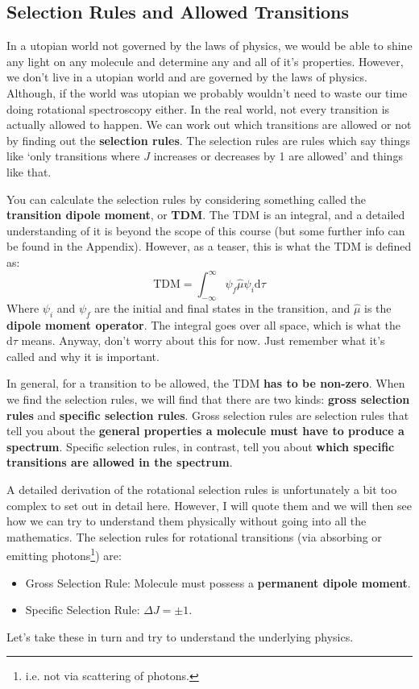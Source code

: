 \documentclass{memoir}[11pt,oneside,a4paper,openany]
\begin{document}
\subsection{Selection Rules and Allowed Transitions}
In a utopian world not governed by the laws of physics, we would be able to shine any light on any molecule and determine any and all of it's properties. However, we don't live in a utopian world and are governed by the laws of physics. Although, if the world was utopian we probably wouldn't need to waste our time doing rotational spectroscopy either. In the real world, not every transition is actually allowed to happen. We can work out which transitions are allowed or not by finding out the \textbf{selection rules}. The selection rules are rules which say things like `only transitions where $J$ increases or decreases by 1 are allowed' and things like that.

You can calculate the selection rules by considering something called the \textbf{transition dipole moment}, or \textbf{TDM}. The TDM is an integral, and a detailed understanding of it is beyond the scope of this course (but some further info can be found in the Appendix). However, as a teaser, this is what the TDM is defined as:
\begin{equation}
	\text{TDM} = \int_{-\infty}^{\infty} \psi_{f}\hat{\mu}\psi_{i} \mathrm{d}\tau
\end{equation}
Where $\psi_i$ and $\psi_f$ are the initial and final states in the transition, and $\hat{\mu}$ is the \textbf{dipole moment operator}. The integral goes over all space, which is what the $\mathrm{d}\tau$ means. Anyway, don't worry about this for now. Just remember what it's called and why it is important.

In general, for a transition to be allowed, the TDM \textbf{has to be non-zero}. When we find the selection rules, we will find that there are two kinds: \textbf{gross selection rules} and \textbf{specific selection rules}. Gross selection rules are selection rules that tell you about the \textbf{general properties a molecule must have to produce a spectrum}. Specific selection rules, in contrast, tell you about \textbf{which specific transitions are allowed in the spectrum}. 

A detailed derivation of the rotational selection rules is unfortunately a bit too complex to set out in detail here. However, I will quote them and we will then see how we can try to understand them physically without going into all the mathematics. The selection rules for rotational transitions (via absorbing or emitting photons\footnote{i.e. not via scattering of photons.}) are: 
\begin{itemize}
	\item Gross Selection Rule: Molecule must possess a \textbf{permanent dipole moment}.
	\item Specific Selection Rule: $\Delta J = \pm 1$.
\end{itemize}
Let's take these in turn and try to understand the underlying physics. 
\end{document}

